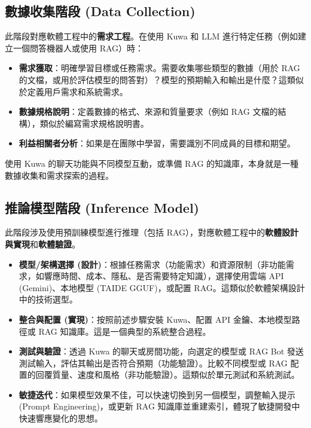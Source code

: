 \documentclass[twocolumn,11pt,a4paper]{article}
\begin{document}
\subsection{數據收集階段 (Data Collection)}
此階段對應軟體工程中的\textbf{需求工程}。在使用 Kuwa 和 LLM 進行特定任務（例如建立一個問答機器人或使用 RAG）時：
\begin{itemize}[noitemsep, topsep=0pt]
    \item \textbf{需求獲取}：明確學習目標或任務需求。需要收集哪些類型的數據（用於 RAG 的文檔，或用於評估模型的問答對）？模型的預期輸入和輸出是什麼？這類似於定義用戶需求和系統需求。
    \item \textbf{數據規格說明}：定義數據的格式、來源和質量要求（例如 RAG 文檔的結構），類似於編寫需求規格說明書。
    \item \textbf{利益相關者分析}：如果是在團隊中學習，需要識別不同成員的目標和期望。
\end{itemize}
使用 Kuwa 的聊天功能與不同模型互動，或準備 RAG 的知識庫，本身就是一種數據收集和需求探索的過程。

\subsection{推論模型階段 (Inference Model)}
此階段涉及使用預訓練模型進行推理（包括 RAG），對應軟體工程中的\textbf{軟體設計與實現}和\textbf{軟體驗證}。
\begin{itemize}[noitemsep, topsep=0pt]
    \item \textbf{模型/架構選擇 (設計)}：根據任務需求（功能需求）和資源限制（非功能需求，如響應時間、成本、隱私、是否需要特定知識），選擇使用雲端 API (Gemini)、本地模型 (TAIDE GGUF)，或配置 RAG。這類似於軟體架構設計中的技術選型。
    \item \textbf{整合與配置 (實現)}：按照前述步驟安裝 Kuwa、配置 API 金鑰、本地模型路徑或 RAG 知識庫。這是一個典型的系統整合過程。
    \item \textbf{測試與驗證}：透過 Kuwa 的聊天或房間功能，向選定的模型或 RAG Bot 發送測試輸入，評估其輸出是否符合預期（功能驗證）。比較不同模型或 RAG 配置的回覆質量、速度和風格（非功能驗證）。這類似於單元測試和系統測試。
    \item \textbf{敏捷迭代}：如果模型效果不佳，可以快速切換到另一個模型，調整輸入提示 (Prompt Engineering)，或更新 RAG 知識庫並重建索引，體現了敏捷開發中快速響應變化的思想。
\end{itemize}
\end{document}
